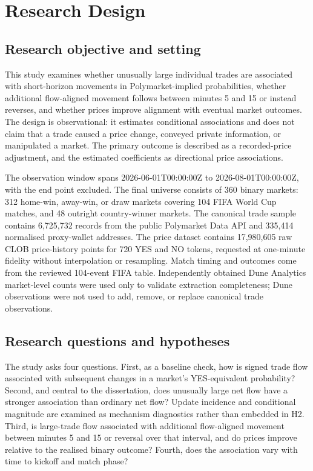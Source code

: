 
\section{Research Design}
\label{sec:research-design}

\subsection{Research objective and setting}

This study examines whether unusually large individual trades are associated with short-horizon movements in Polymarket-implied probabilities, whether additional flow-aligned movement follows between minutes 5 and 15 or instead reverses, and whether prices improve alignment with eventual market outcomes. The design is observational: it estimates conditional associations and does not claim that a trade caused a price change, conveyed private information, or manipulated a market. The primary outcome is described as a recorded-price adjustment, and the estimated coefficients as directional price associations.

The observation window spans 2026-06-01T00:00:00Z to 2026-08-01T00:00:00Z, with the end point excluded. The final universe consists of 360 binary markets: 312 home-win, away-win, or draw markets covering 104 FIFA World Cup matches, and 48 outright country-winner markets. The canonical trade sample contains 6,725,732 records from the public Polymarket Data API and 335,414 normalised proxy-wallet addresses. The price dataset contains 17,980,605 raw CLOB price-history points for 720 YES and NO tokens, requested at one-minute fidelity without interpolation or resampling. Match timing and outcomes come from the reviewed 104-event FIFA table. Independently obtained Dune Analytics market-level counts were used only to validate extraction completeness; Dune observations were not used to add, remove, or replace canonical trade observations.

\subsection{Research questions and hypotheses}

The study asks four questions. First, as a baseline check, how is signed trade flow associated with subsequent changes in a market's YES-equivalent probability? Second, and central to the dissertation, does unusually large net flow have a stronger association than ordinary net flow? Update incidence and conditional magnitude are examined as mechanism diagnostics rather than embedded in H2. Third, is large-trade flow associated with additional flow-aligned movement between minutes 5 and 15 or reversal over that interval, and do prices improve relative to the realised binary outcome? Fourth, does the association vary with time to kickoff and match phase?

